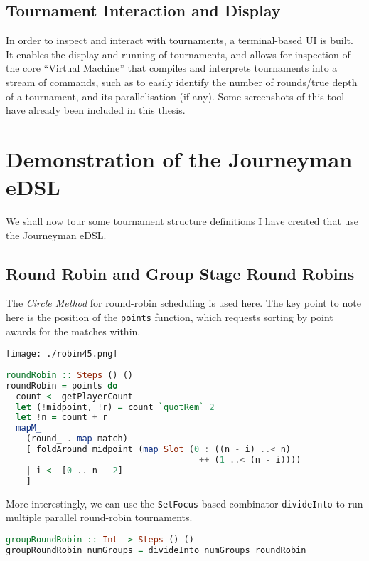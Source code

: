 \documentclass[a4,11pt,twoside,final,hidelinks]{article}
\begin{document}
\subsection{Tournament Interaction and Display}
\label{sec:org1437406}

In order to inspect and interact with tournaments, a terminal-based UI is built.
It enables the display and running of tournaments, and allows for inspection of
the core ``Virtual Machine'' that compiles and interprets tournaments into a
stream of commands, such as to easily identify the number of rounds/true depth
of a tournament, and its parallelisation (if any). Some screenshots of this tool
have already been included in this thesis.

\newpage

\section{Demonstration of the Journeyman eDSL}
\label{sec:org07594c6}

We shall now tour some tournament structure definitions I have created that use
the Journeyman eDSL.


\subsection{Round Robin and Group Stage Round Robins}
\label{sec:orgf1f1828}
The \emph{Circle Method} for round-robin scheduling is used here. The key point to
note here is the position of the \texttt{points} function, which requests sorting by
point awards for the matches within.

\begin{center}
\texttt{[image: ./robin45.png]}
\end{center}

\begin{lstlisting}[language=haskell,numbers=none]
roundRobin :: Steps () ()
roundRobin = points do
  count <- getPlayerCount
  let (!midpoint, !r) = count `quotRem` 2
  let !n = count + r
  mapM_
    (round_ . map match)
    [ foldAround midpoint (map Slot (0 : ((n - i) ..< n)
                                      ++ (1 ..< (n - i))))
    | i <- [0 .. n - 2]
    ]
\end{lstlisting}

More interestingly, we can use the \texttt{SetFocus}-based combinator \texttt{divideInto} to
run multiple parallel round-robin tournaments.

\begin{lstlisting}[language=haskell,numbers=none]
groupRoundRobin :: Int -> Steps () ()
groupRoundRobin numGroups = divideInto numGroups roundRobin
\end{lstlisting}
\end{document}
